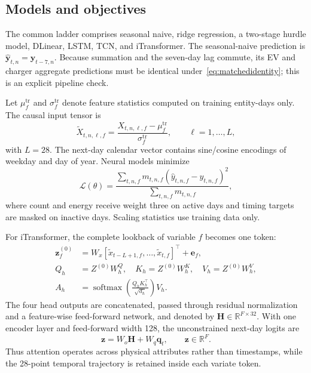 \documentclass[11pt]{article}
\begin{document}
\subsection{Models and objectives}

The common ladder comprises seasonal naive, ridge regression, a two-stage
hurdle model, DLinear, LSTM, TCN, and iTransformer.
The seasonal-naive prediction is
\(\widehat{\mathbf y}_{t,n}=\mathbf y_{t-7,n}\).
Because summation and the seven-day lag commute, its EV and charger aggregate
predictions must be identical under~\eqref{eq:matchedidentity}; this is an
explicit pipeline check.

Let \(\mu_f^{\mathrm{tr}}\) and \(\sigma_f^{\mathrm{tr}}\) denote feature
statistics computed on training entity-days only.  The causal input tensor is
\begin{equation}
 \widetilde X_{t,n,\ell,f}
 =
 \frac{X_{t,n,\ell,f}-\mu_f^{\mathrm{tr}}}
 {\sigma_f^{\mathrm{tr}}},
 \qquad \ell=1,\ldots,L,                              \label{eq:standardize}
\end{equation}
with \(L=28\).  The next-day calendar vector contains sine/cosine encodings of
weekday and day of year.  Neural models minimize
\begin{equation}
 \mathcal L(\theta)=
 \frac{\sum_{t,n,f}m_{t,n,f}
 (\widehat y_{t,n,f}-y_{t,n,f})^2}
 {\sum_{t,n,f}m_{t,n,f}},                              \label{eq:forecastloss}
\end{equation}
where count and energy receive weight three on active days and timing targets
are masked on inactive days.  Scaling statistics use training data only.

For iTransformer, the complete lookback of variable \(f\) becomes one token:
\begin{align}
 \mathbf z_f^{(0)}
 &=W_x[\widetilde x_{t-L+1,f},\ldots,
       \widetilde x_{t,f}]^\top+\mathbf e_f,             \label{eq:itoken}\\
 Q_h&=Z^{(0)}W_h^Q,\quad K_h=Z^{(0)}W_h^K,\quad
 V_h=Z^{(0)}W_h^V,                                      \label{eq:iqkv}\\
 A_h&=\operatorname{softmax}\!\left(
 \frac{Q_hK_h^\top}{\sqrt{d_h}}\right)V_h.              \label{eq:iattention}
\end{align}
The four head outputs are concatenated, passed through residual normalization
and a feature-wise feed-forward network, and denoted by
\(\mathbf H\in\mathbb R^{F\times32}\).  With one encoder layer and feed-forward
width 128, the unconstrained next-day logits are
\begin{equation}
 \mathbf z=W_o\mathbf H+W_q\mathbf q_t,
 \qquad \mathbf z\in\mathbb R^F.                        \label{eq:itransformer}
\end{equation}
Thus attention operates across physical attributes rather than timestamps,
while the 28-point temporal trajectory is retained inside each variate token.
\end{document}
